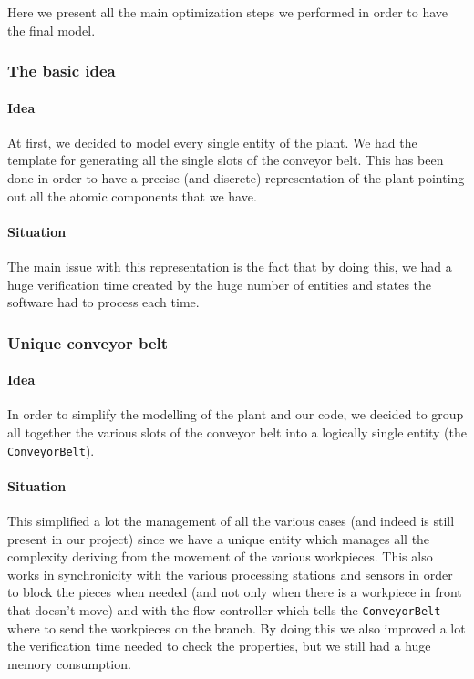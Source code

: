 \documentclass[a4paper]{article}
\begin{document}
    Here we present all the main optimization steps we performed in order to have the final model.

    \subsubsection{The basic idea}

    \paragraph{Idea} At first, we decided to model every single entity of the plant. We had the template for generating all the single slots of the conveyor belt. This has been done in order to have a precise (and discrete) representation of the plant pointing out all the atomic components that we have.

    \paragraph{Situation} The main issue with this representation is the fact that by doing this, we had a huge verification time created by the huge number of entities and states the software had to process each time.

    \subsubsection{Unique conveyor belt}

    \paragraph{Idea} In order to simplify the modelling of the plant and our code, we decided to group all together the various slots of the conveyor belt into a logically single entity (the \texttt{ConveyorBelt}).

    \paragraph{Situation} This simplified a lot the management of all the various cases (and indeed is still present in our project) since we have a unique entity which manages all the complexity deriving from the movement of the various workpieces. This also works in synchronicity with the various processing stations and sensors in order to block the pieces when needed (and not only when there is a workpiece in front that doesn't move) and with the flow controller which tells the \texttt{ConveyorBelt} where to send the workpieces on the branch. By doing this we also improved a lot the verification time needed to check the properties, but we still had a huge memory consumption.
\end{document}
